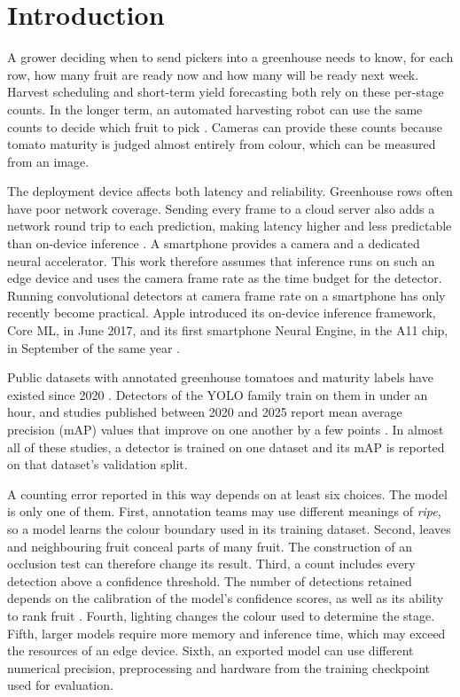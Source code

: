 \section{Introduction}

A grower deciding when to send pickers into a greenhouse needs to know, for
each row, how many fruit are ready now and how many will be ready next week.
Harvest scheduling and short-term yield forecasting both rely on these
per-stage counts. In the longer term, an automated harvesting robot can use the
same counts to decide which fruit to pick \cite{kootstra2021harvesting, yaguchi2016tomato}.
Cameras can provide these counts because tomato maturity is judged almost
entirely from colour, which can be measured from an image.

The deployment device affects both latency and reliability. Greenhouse rows
often have poor network coverage. Sending every frame to a cloud server also
adds a network round trip to each prediction, making latency higher and less
predictable than on-device inference \cite{kang2017neurosurgeon, shi2016edge}.
A smartphone provides a camera and a dedicated neural accelerator. This work
therefore assumes that inference runs on such an edge device and uses the camera
frame rate as the time budget for the detector. Running convolutional detectors
at camera frame rate on a smartphone has only recently become practical. Apple
introduced its on-device inference framework, Core ML, in June 2017, and its
first smartphone Neural Engine, in the A11 chip, in September of the same year
\cite{apple2017ios11, apple2017iphonex}.

Public datasets with annotated greenhouse tomatoes and maturity labels have
existed since 2020 \cite{laborotomato2020, tsironis2020tomatod}. Detectors of
the YOLO family \cite{redmon2016yolo, khanam2024yolov11} train on them in under
an hour, and studies published between 2020 and 2025 report mean average
precision (mAP) values that improve on one another by a few points
\cite{liu2020yolotomato, su2022seyolov3, li2023yolov5tomato, li2023mhsayolov8, camacho2023tomato}. In almost all of these studies, a
detector is trained on one dataset and its mAP is reported on that dataset's
validation split.

A counting error reported in this way depends on at least six choices. The
model is only one of them. First, annotation teams may use different meanings
of \emph{ripe}, so a model learns the colour boundary used in its training
dataset. Second, leaves and neighbouring fruit conceal parts of many fruit. The
construction of an occlusion test can therefore change its result. Third, a
count includes every detection above a confidence threshold. The number of
detections retained depends on the calibration of the model's confidence
scores, as well as its ability to rank fruit \cite{guo2017calibration}. Fourth,
lighting changes the colour used to determine the stage. Fifth, larger models
require more memory and inference time, which may exceed the resources of an
edge device. Sixth, an exported model can use different numerical precision,
preprocessing and hardware from the training checkpoint used for evaluation.

